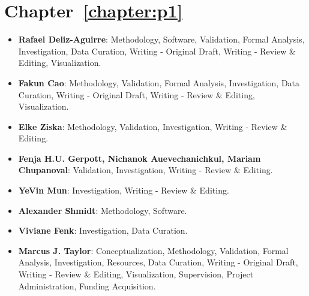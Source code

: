 \section*{Chapter~\ref{chapter:p1}}
\begin{itemize}
\item \textbf{Rafael Deliz-Aguirre}: Methodology, Software, Validation, Formal Analysis, Investigation, Data Curation, Writing - Original Draft, Writing - Review \& Editing, Visualization.

\item \textbf{Fakun Cao}: Methodology, Validation, Formal Analysis, Investigation, Data Curation, Writing - Original Draft, Writing - Review \& Editing, Visualization.

\item \textbf{Elke Ziska}: Methodology, Validation, Investigation, Writing - Review \& Editing.

\item \textbf{Fenja H.U. Gerpott, Nichanok Auevechanichkul, Mariam Chupanoval}: Validation, Investigation, Writing - Review \& Editing.

\item \textbf{YeVin Mun}: Investigation, Writing - Review \& Editing.

\item \textbf{Alexander Shmidt}: Methodology, Software.

\item \textbf{Viviane Fenk}: Investigation, Data Curation.

\item \textbf{Marcus J. Taylor}: Conceptualization, Methodology, Validation, Formal Analysis, Investigation, Resources, Data Curation, Writing - Original Draft, Writing - Review \& Editing, Visualization, Supervision, Project Administration, Funding Acquisition.

\end{itemize}

